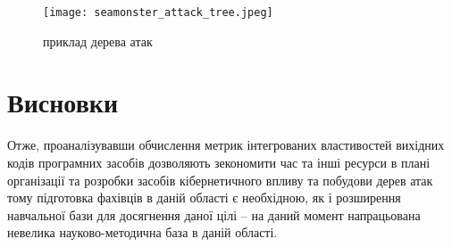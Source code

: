 \begin{figure}
    \centering
    \texttt{[image: seamonster\_attack\_tree.jpeg]}
    \caption{приклад дерева атак}
    \label{fig:attack_tree_example}
\end{figure}

\section*{Висновки}
Отже, проаналізувавши обчислення метрик інтегрованих властивостей вихідних кодів програмних засобів дозволяють зекономити час та інші ресурси в плані організації та розробки засобів кібернетичного впливу та побудови дерев атак тому підготовка фахівців в даній області є необхідною, як і розширення навчальної бази для досягнення даної цілі – на даний момент напрацьована невелика науково-методична база в даній області.